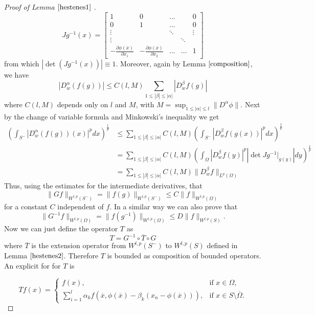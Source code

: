 \documentclass[12pt]{article}
\theoremstyle{definition}
\begin{document}
\begin{proof}[Proof of Lemma $\ref{hestenes1}$ ]
\[ Jg^{-1}(x)= \begin{bmatrix}
		1             &             0  &            \dots &            &0 \\
		0             & 1              &   \dots           &            & 0\\
		\vdots    &                 &  \ddots           &  & \vdots\\
		\vdots    &                 &           &\ddots    &\\
		-\frac{\partial \phi(\overline x)}{\partial x_1} &-\frac{\partial \phi(\overline x)}{\partial x_2}& \dots & \dots & 1 
	\end{bmatrix}
\]
from which $|\det(Jg^{-1}(x))| \equiv 1 $. Moreover, again by Lemma $\ref{composition}$, we have
\[ |D^{\alpha}_w(f(g))| \le C(l,M) \sum_{1\le |\beta|\le|\alpha| }|D^{\beta}_wf(g)|\]
where $C(l,M)$ depends only on $l$ and $M$, with $M= \sup_{1\le|\alpha|\le l} \| D^\alpha \phi \|$.
Next by the change of variable formula and Minkowski's inequality we get
\begin{align*}
 \left( \int_{S^-} |D^{\alpha}_w(f(g))(x)|^p dx \right)^{\frac{1}{p}} & \le \sum_{1\le |\beta|\le|\alpha| } C(l,M) \left( \int_{S^-} |D^{\beta}_wf(g(x))|^p  dx\right)^{\frac{1}{p}}  \\
										      &=  \sum_{1\le |\beta|\le|\alpha| } C(l,M)\left(  \int_\Omega |D^{\beta}_wf(y)|^p |\det Jg^{-1}\big|_{g(y)}|  dy\right)^{\frac{1}{p}}  \\
  											&=  \sum_{1\le |\beta|\le|\alpha| } C(l,M) \|D^{\beta}_wf \|_{L^p(\Omega)}					
\end{align*}
Thus, using the estimates for the intermediate derivatives, that
\[ \| Gf\|_{W^{l,p}(S^-)} =\| f(g)\|_{W^{l,p}(S^-)} \le C \| f\|_{W^{l,p}(\Omega)}\]
for a constant $C$ independent of $f$. In a similar way we can also prove that 
\[ \| G^{-1}f\|_{W^{l,p}(\Omega)}=\| f(g^{-1})\|_{W^{l,p}(\Omega)} \le D \| f\|_{W^{l,p}(S)}.\]
Now we can just define the operator $T$ as
\[  T=G^{-1} \circ \overline T \circ G\]
where $\overline T$ is the extension operator from $W^{l,p}(S^-)$ to $W^{l,p}(S)$ defined in Lemma $\ref{hestenes2}$. Therefore $T$ is bounded as composition of bounded operators. An explicit for for $T$ is

\[ Tf(x) = \begin{cases}
		f(x), & \text{if } x \in \Omega,\\
		\sum_{i=1}^l \alpha_k f(\overline x, \phi(\overline x)- \beta_k(x_n-\phi(\overline x))), & \text{if } x \in S \setminus \overline \Omega.
\end{cases} 
\]
\end{proof}
\end{document}

